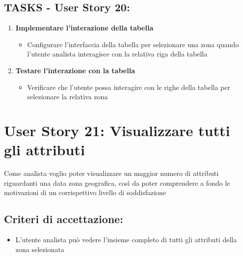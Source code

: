     \subsection*{TASKS - User Story 20:}  
    \begin{enumerate}  
        \item \textbf{Implementare l'interazione della tabella}  
            \begin{itemize}  
                \item Configurare l'interfaccia della tabella per selezionare una zona quando l'utente analista interagisce con la relativa riga della tabella
            \end{itemize} 
        \item \textbf{Testare l'interazione con la tabella}  
            \begin{itemize}  
                \item Verificare che l'utente possa interagire con le righe della tabella per selezionare la relativa zona
            \end{itemize} 
    \end{enumerate}
\section*{User Story 21: Visualizzare tutti gli attributi}
    Come analista voglio poter visualizzare un maggior numero di attributi riguardanti una data zona geografica, così da poter comprendere a fondo le motivazioni di un corrispettivo livello di soddisfazione
    \subsection*{Criteri di accettazione:}  
    \begin{itemize}  
        \item L'utente analista può vedere l'insieme completo di tutti gli attributi della zona selezionata
    \end{itemize}  
